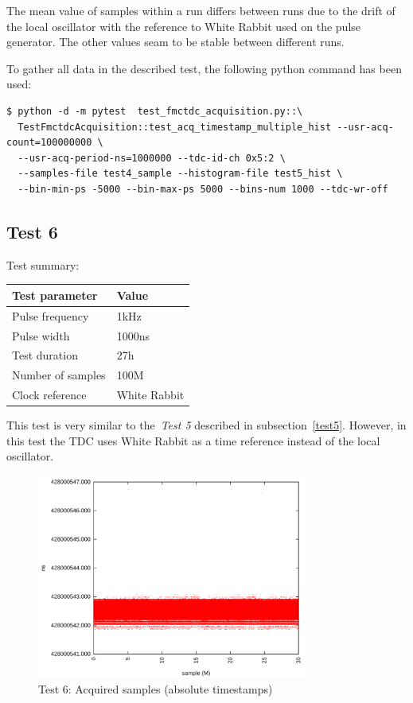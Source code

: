 \documentclass[a4paper, 12pt]{article}
\begin{document}
The mean value of samples within a run differs between runs due to the drift
of the local oscillator with the reference to White Rabbit used on
the pulse generator. The other values seam to be stable between different runs.

To gather all data in the described test, the following python command has been
used:
\begin{lstlisting}
$ python -d -m pytest  test_fmctdc_acquisition.py::\
  TestFmctdcAcquisition::test_acq_timestamp_multiple_hist --usr-acq-count=100000000 \
  --usr-acq-period-ns=1000000 --tdc-id-ch 0x5:2 \
  --samples-file test4_sample --histogram-file test5_hist \
  --bin-min-ps -5000 --bin-max-ps 5000 --bins-num 1000 --tdc-wr-off
\end{lstlisting}

\FloatBarrier

\subsection{Test 6}
\label{test6}
Test summary:
\begin{center}
  \begin{tabular}{|l|l|}
    \hline {\bf Test parameter} & {\bf Value} \\
    \hline
    Pulse frequency                      & 1kHz  \\
    Pulse width                          & 1000ns \\
    Test duration                        & 27h \\
    Number of samples                    & 100M \\
    Clock reference                      & White Rabbit \\
    \hline
  \end{tabular}
\end{center}

This test is very similar to the~\textit{Test 5} described in
subsection~\ref{test5}.
However, in this test the TDC uses White Rabbit as a time reference
instead of the local oscillator.

\begin{figure}[ht!]
  \centering
  \includegraphics[width=0.80\textwidth]{img/test6_samples_absolute.png}
  \caption{Test 6: Acquired samples (absolute timestamps)}
  \label{test6_absolute}
\end{figure}
\end{document}
